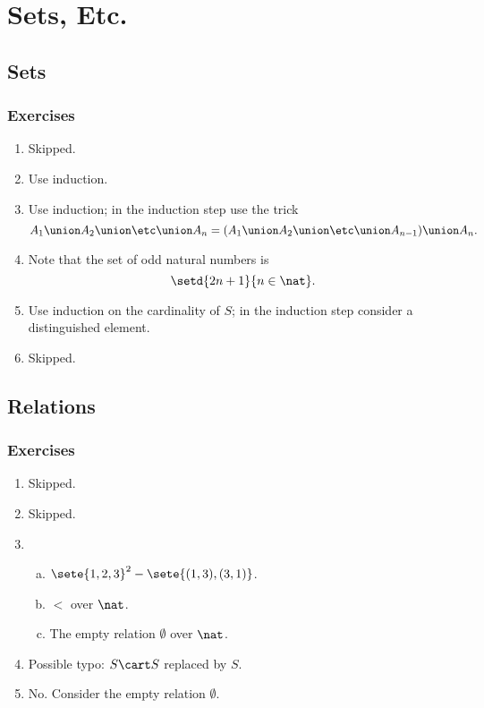 \setcounter{chapter}{1}
\chapter{Sets, Etc.}
\section{Sets}
\subsection*{Exercises}
\begin{enumerate}[\thesection-1]
%
\item Skipped.
%
\item Use induction.
%
\item Use induction; in the induction step use the trick
\[
A_1 \union A_2 \union \etc \union A_n = (A_1 \union A_2 \union \etc \union A_{n - 1}) \union A_n.
\]
%
\item Note that the set of odd natural numbers is
\[
\setd{2n + 1}{n \in \nat}.
\]
%
\item Use induction on the cardinality of $S$; in the induction step consider a distinguished element.
%
\item Skipped.
%
\end{enumerate}

\section{Relations}
\subsection*{Exercises}
\begin{enumerate}[\thesection-1]
%
\item Skipped.
%
\item Skipped.
%
\item \begin{enumerate}[a.]
\item $\sete{1, 2, 3}^2 - \sete{(1, 3), (3, 1)}$.
\item $<$ over $\nat$.
\item The empty relation $\emptyset$ over $\nat$.
\end{enumerate}
%
\item Possible typo: $S \cart S$ replaced by $S$.
%
\item No. Consider the empty relation $\emptyset$.
%
\end{enumerate}

